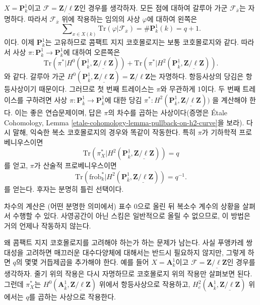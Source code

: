 \medskip\noindent
$X = \mathbf{P}^1_k$이고
$\mathcal{F} = \underline{\mathbf{Z}/\ell\mathbf{Z}}$인 경우를 생각하자.
모든 점에 대하여 갈루아 가군 $\mathcal{F}_{\bar x}$는 자명하다. 따라서
$\mathcal{F}_{\bar x}$ 위에 작용하는 임의의 사상 $\varphi$에 대하여
왼쪽은
$$
\sum\nolimits_{x \in X(k)} \text{Tr}(\varphi | \mathcal{F}_{\bar x}) =
\#\mathbf{P}^1_k(k) = q+1.
$$
이다. 이제 $\mathbf{P}^1_k$는 고유하므로 콤팩트 지지 코호몰로지는
보통 코호몰로지와 같다. 따라서 사상
$\pi : \mathbf{P}^1_k \to \mathbf{P}^1_k$에 대하여 오른쪽은
$$
\text{Tr}(\pi^* | H^0 (\mathbf{P}^1_{\bar k},
\underline{\mathbf{Z}/\ell\mathbf{Z}})) + \text{Tr}(\pi^* | H^2
(\mathbf{P}^1_{\bar k}, \underline{\mathbf{Z}/\ell\mathbf{Z}})).
$$
와 같다. 갈루아 가군
$H^0 (\mathbf{P}^1_{\bar k},
\underline{\mathbf{Z}/\ell\mathbf{Z}}) = \mathbf{Z}/\ell\mathbf{Z}$는
자명하다. 항등사상의 당김은 항등사상이기 때문이다. 그러므로 첫 번째
트레이스는 $\pi$와 무관하게 1이다. 두 번째 트레이스를 구하려면 사상
$\pi : \mathbf{P}^1_{\bar k} \to \mathbf{P}^1_{\bar k}$에 대한 당김
$\pi^* : H^2(\mathbf{P}^1_{\bar k}, \underline{\mathbf{Z}/\ell\mathbf{Z}}))$
을 계산해야 한다.
이는 좋은 연습문제이며, 답은 $\pi$의 차수를 곱하는 사상이다(증명은
\'Etale Cohomology, Lemma
\ref{etale-cohomology-lemma-pullback-on-h2-curve}을 보라). 다시 말해,
익숙한 복소 코호몰로지의 경우와 똑같이 작동한다. 특히 $\pi$가
기하학적 프로베니우스이면
$$
\text{Tr}(\pi_X^* | H^2 (\mathbf{P}^1_{\bar k},
\underline{\mathbf{Z}/\ell\mathbf{Z}})) = q
$$
를 얻고, $\pi$가 산술적 프로베니우스이면
$$
\text{Tr}(\text{frob}_k^* | H^2 (\mathbf{P}^1_{\bar k},
\underline{\mathbf{Z}/\ell\mathbf{Z}})) = q^{-1}.
$$
를 얻는다. 후자는 분명히 틀린 선택이다.

\begin{remark}
\label{remark-compute-degree-lifting}
차수의 계산은 (어떤 분명한 의미에서) 표수 0으로 올린 뒤 복소수 계수의
상황을 살펴서 수행할 수 있다. 사영공간이 아닌 스킴은 일반적으로 올릴
수 없으므로, 이 방법은 거의 언제나 작동하지 않는다.
\end{remark}

\noindent
왜 콤팩트 지지 코호몰로지를 고려해야 하는가 하는 문제가 남는다.
사실 푸앵카레 쌍대성을 고려하면 매끄러운 대수다양체에 대해서는 반드시
필요하지 않지만, 그렇게 하면 $q$의 몇몇 거듭제곱을 추가해야 한다.
예를 들어 $X = \mathbf{A}^1_k$이고
$\mathcal{F} = \underline{\mathbf{Z}/\ell\mathbf{Z}}$인 경우를 생각하자.
줄기 위의 작용은 다시 자명하므로 코호몰로지 위의 작용만 살펴보면 된다.
그런데 $\pi_X^*$는
$H^0(\mathbf{A}^1_{\bar k}, \underline{\mathbf{Z}/\ell\mathbf{Z}})$
위에서 항등사상으로 작용하고,
$H^2_c(\mathbf{A}^1_{\bar k}, \underline{\mathbf{Z}/\ell\mathbf{Z}})$
위에서는 $q$를 곱하는 사상으로 작용한다.


